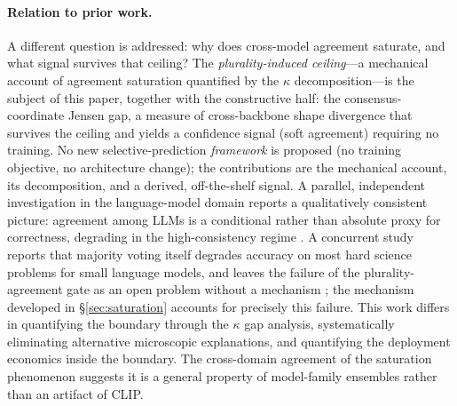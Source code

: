 \documentclass[a4paper,fleqn]{cas-sc}
\begin{document}
\paragraph{Relation to prior work.}
A different question is addressed: why does cross-model agreement saturate, and what signal survives that ceiling?
The \emph{plurality-induced ceiling}—a mechanical account of agreement saturation quantified by the $\kappa$ decomposition—is the subject of this paper, together with the constructive half: the consensus-coordinate Jensen gap, a measure of cross-backbone shape divergence that survives the ceiling and yields a confidence signal (soft agreement) requiring no training.
No new selective-prediction \emph{framework} is proposed (no training objective, no architecture change); the contributions are the mechanical account, its decomposition, and a derived, off-the-shelf signal.
A parallel, independent investigation in the language-model domain reports a qualitatively consistent picture: agreement among LLMs is a conditional rather than absolute proxy for correctness, degrading in the high-consistency regime \citep{ding2026agree}.
A concurrent study reports that majority voting itself degrades accuracy on most hard science problems for small language models, and leaves the failure of the plurality-agreement gate as an open problem without a mechanism \citep{bahuguna2026backfires}; the mechanism developed in \S\ref{sec:saturation} accounts for precisely this failure.
This work differs in quantifying the boundary through the $\kappa$ gap analysis, systematically eliminating alternative microscopic explanations, and quantifying the deployment economics inside the boundary.
The cross-domain agreement of the saturation phenomenon suggests it is a general property of model-family ensembles rather than an artifact of CLIP.
\end{document}
